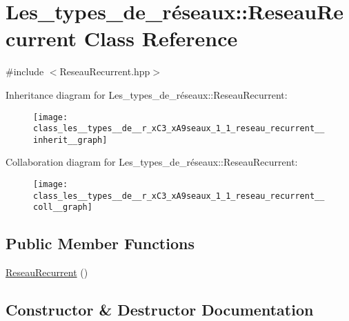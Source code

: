 \hypertarget{class_les__types__de__r_xC3_xA9seaux_1_1_reseau_recurrent}{}\section{Les\+\_\+types\+\_\+de\+\_\+réseaux\+:\+:Reseau\+Recurrent Class Reference}
\label{class_les__types__de__r_xC3_xA9seaux_1_1_reseau_recurrent}


{\ttfamily \#include $<$Reseau\+Recurrent.\+hpp$>$}



Inheritance diagram for Les\+\_\+types\+\_\+de\+\_\+réseaux\+:\+:Reseau\+Recurrent\+:
\nopagebreak
\begin{figure}[H]
\begin{center}
\leavevmode
\texttt{[image: class\_les\_\_types\_\_de\_\_r\_xC3\_xA9seaux\_1\_1\_reseau\_recurrent\_\_inherit\_\_graph]}
\end{center}
\end{figure}


Collaboration diagram for Les\+\_\+types\+\_\+de\+\_\+réseaux\+:\+:Reseau\+Recurrent\+:
\nopagebreak
\begin{figure}[H]
\begin{center}
\leavevmode
\texttt{[image: class\_les\_\_types\_\_de\_\_r\_xC3\_xA9seaux\_1\_1\_reseau\_recurrent\_\_coll\_\_graph]}
\end{center}
\end{figure}
\subsection*{Public Member Functions}
\begin{DoxyCompactItemize}
\item 
\hyperlink{class_les__types__de__r_xC3_xA9seaux_1_1_reseau_recurrent_ab1c6beaad922605eb470edae8d47ee24}{Reseau\+Recurrent} ()
\end{DoxyCompactItemize}


\subsection{Constructor \& Destructor Documentation}
\mbox{\label{class_les__types__de__r_xC3_xA9seaux_1_1_reseau_recurrent_ab1c6beaad922605eb470edae8d47ee24}} 
